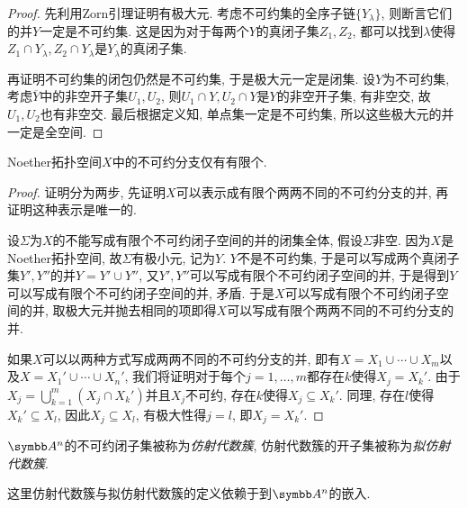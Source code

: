 \begin{proof}
  先利用Zorn引理证明有极大元. 考虑不可约集的全序子链$\{Y_\lambda\}$, 则断言它们的并$Y$一定是不可约集. 这是因为对于每两个$Y$的真闭子集$Z_1, Z_2$, 都可以找到$\lambda$使得$Z_1\cap Y_\lambda, Z_2\cap Y_\lambda$是$Y_\lambda$的真闭子集.

  再证明不可约集的闭包仍然是不可约集, 于是极大元一定是闭集. 设$Y$为不可约集, 考虑$\overline{Y}$中的非空开子集$U_1, U_2$, 则$U_1\cap Y, U_2\cap Y$是$Y$的非空开子集, 有非空交, 故$U_1, U_2$也有非空交. 最后根据定义知, 单点集一定是不可约集, 所以这些极大元的并一定是全空间.
\end{proof}

\begin{proposition}\label{prop:noetherirreduciblecomponent}
  Noether拓扑空间$X$中的不可约分支仅有有限个.
\end{proposition}

\begin{proof}
  证明分为两步, 先证明$X$可以表示成有限个两两不同的不可约分支的并, 再证明这种表示是唯一的.

  设$\Sigma$为$X$的不能写成有限个不可约闭子空间的并的闭集全体, 假设$\Sigma$非空. 因为$X$是Noether拓扑空间, 故$\Sigma$有极小元, 记为$Y$. $Y$不是不可约集, 于是可以写成两个真闭子集$Y', Y''$的并$Y=Y'\cup Y''$, 又$Y', Y''$可以写成有限个不可约闭子空间的并, 于是得到$Y$可以写成有限个不可约闭子空间的并, 矛盾. 于是$X$可以写成有限个不可约闭子空间的并, 取极大元并抛去相同的项即得$X$可以写成有限个两两不同的不可约分支的并.

  如果$X$可以以两种方式写成两两不同的不可约分支的并, 即有$X=X_1\cup\dotsb\cup X_m$以及$X=X_1'\cup\dotsb\cup X_n'$, 我们将证明对于每个$j=1, \dotsc, m$都存在$k$使得$X_j=X_k'$. 由于$X_j=\bigcup_{k=1}^m(X_j\cap X_k')$并且$X_j$不可约, 存在$k$使得$X_j\subseteq X_k'$. 同理, 存在$l$使得$X_k'\subseteq X_l$, 因此$X_j\subseteq X_l$, 有极大性得$j=l$, 即$X_j=X_k'$.
\end{proof}

\begin{definition}
  $\AF^n$的不可约闭子集被称为\emph{仿射代数簇}, 仿射代数簇的开子集被称为\emph{拟仿射代数簇}.
\end{definition}

\begin{remark}
  这里仿射代数簇与拟仿射代数簇的定义依赖于到$\AF^n$的嵌入.
\end{remark}

